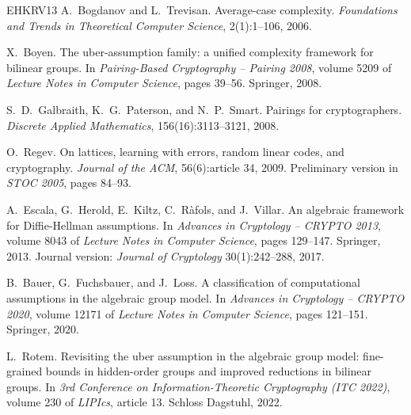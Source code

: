\documentclass{aicr-solution}
\begin{document}
\begin{aicrbibliography}{EHKRV13}
A.~Bogdanov and L.~Trevisan.
Average-case complexity.
\emph{Foundations and Trends in Theoretical Computer Science}, 2(1):1--106, 2006.

X.~Boyen.
The uber-assumption family: a unified complexity framework for bilinear groups.
In \emph{Pairing-Based Cryptography -- Pairing 2008},
volume 5209 of \emph{Lecture Notes in Computer Science}, pages 39--56. Springer, 2008.

S.~D.~Galbraith, K.~G.~Paterson, and N.~P.~Smart.
Pairings for cryptographers.
\emph{Discrete Applied Mathematics}, 156(16):3113--3121, 2008.

O.~Regev.
On lattices, learning with errors, random linear codes, and cryptography.
\emph{Journal of the ACM}, 56(6):article 34, 2009.
Preliminary version in \emph{STOC 2005}, pages 84--93.

A.~Escala, G.~Herold, E.~Kiltz, C.~R\`afols, and J.~Villar.
An algebraic framework for Diffie-Hellman assumptions.
In \emph{Advances in Cryptology -- CRYPTO 2013},
volume 8043 of \emph{Lecture Notes in Computer Science}, pages 129--147. Springer, 2013.
Journal version: \emph{Journal of Cryptology} 30(1):242--288, 2017.

B.~Bauer, G.~Fuchsbauer, and J.~Loss.
A classification of computational assumptions in the algebraic group model.
In \emph{Advances in Cryptology -- CRYPTO 2020},
volume 12171 of \emph{Lecture Notes in Computer Science}, pages 121--151. Springer, 2020.

L.~Rotem.
Revisiting the uber assumption in the algebraic group model: fine-grained bounds in
hidden-order groups and improved reductions in bilinear groups.
In \emph{3rd Conference on Information-Theoretic Cryptography (ITC 2022)},
volume 230 of \emph{LIPIcs}, article 13. Schloss Dagstuhl, 2022.

\end{aicrbibliography}
\end{document}
